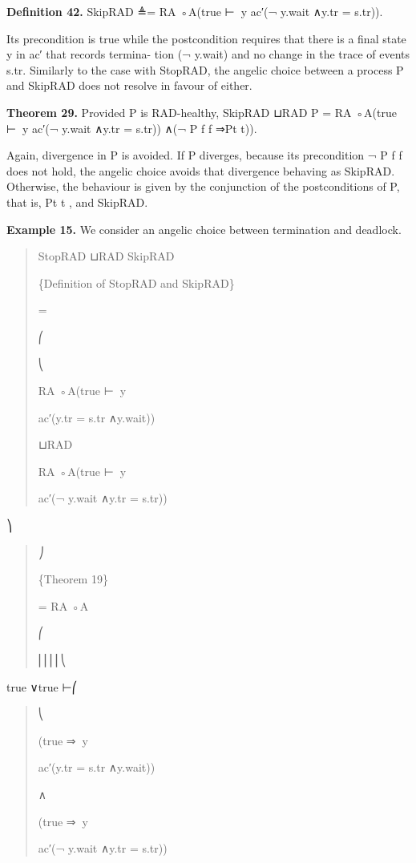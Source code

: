 \documentclass[11pt]{article}
\begin{document}
\noindent\textbf{Definition 42.} SkipRAD ≜= RA ◦A(true ⊢∈⃝y ac′(¬ y.wait ∧y.tr = s.tr)).


Its precondition is true while the postcondition requires that there is a final state y in ac′ that records termina- tion (¬ y.wait) and no change in the trace of events s.tr. Similarly to the case with StopRAD, the angelic choice between a process P and SkipRAD does not resolve in favour of either.

\noindent\textbf{Theorem 29.} Provided P is RAD-healthy, SkipRAD ⊔RAD P = RA ◦A(true ⊢∈⃝y ac′(¬ y.wait ∧y.tr = s.tr)) ∧(¬ P f f ⇒Pt t)).


Again, divergence in P is avoided. If P diverges, because its precondition ¬ P f f does not hold, the angelic choice avoids that divergence behaving as SkipRAD. Otherwise, the behaviour is given by the conjunction of the postconditions of P, that is, Pt t , and SkipRAD.

\noindent\textbf{Example 15.} We consider an angelic choice between termination and deadlock.


\begin{quote}\small\raggedright
StopRAD ⊔RAD SkipRAD
\par
\{Definition of StopRAD and SkipRAD\}
\par
=
\par
⎛
\par
⎝
\par
RA ◦A(true ⊢∈⃝y
\par
ac′(y.tr = s.tr ∧y.wait))
\par
⊔RAD
\par
RA ◦A(true ⊢∈⃝y
\par
ac′(¬ y.wait ∧y.tr = s.tr))
\end{quote}

⎞

\begin{quote}\small\raggedright
⎠
\par
\{Theorem 19\}
\par
= RA ◦A
\par
⎛
\par
⎜⎜⎜⎜⎝
\end{quote}

true ∨true ⊢⎛

\begin{quote}\small\raggedright
⎝
\par
(true ⇒∈⃝y
\par
ac′(y.tr = s.tr ∧y.wait))
\par
∧
\par
(true ⇒∈⃝y
\par
ac′(¬ y.wait ∧y.tr = s.tr))
\end{quote}
\end{document}
